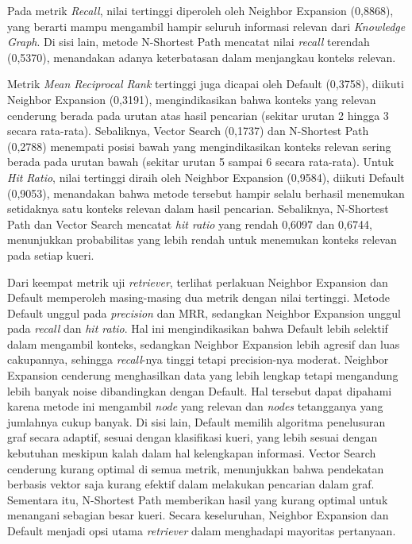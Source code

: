 Pada metrik \textit{Recall}, nilai tertinggi diperoleh oleh Neighbor Expansion (0,8868), yang berarti mampu mengambil hampir seluruh informasi relevan dari \textit{Knowledge Graph}.
Di sisi lain, metode N-Shortest Path mencatat nilai \textit{recall} terendah (0,5370), menandakan adanya keterbatasan dalam menjangkau konteks relevan.

Metrik \textit{Mean Reciprocal Rank} tertinggi juga dicapai oleh Default (0,3758), diikuti Neighbor Expansion (0,3191), mengindikasikan bahwa konteks yang relevan cenderung berada pada urutan atas hasil pencarian (sekitar urutan 2 hingga 3 secara rata-rata).
Sebaliknya, Vector Search (0,1737) dan N-Shortest Path (0,2788) menempati posisi bawah  yang mengindikasikan konteks relevan sering berada pada urutan bawah (sekitar urutan 5 sampai 6 secara rata-rata).
Untuk \textit{Hit Ratio}, nilai tertinggi diraih oleh Neighbor Expansion (0,9584), diikuti Default (0,9053), menandakan bahwa metode tersebut hampir selalu berhasil menemukan setidaknya satu konteks relevan dalam hasil pencarian.
Sebaliknya, N-Shortest Path dan Vector Search mencatat \textit{hit ratio} yang rendah 0,6097 dan 0,6744, menunjukkan probabilitas yang lebih rendah untuk menemukan konteks relevan pada setiap kueri.

Dari keempat metrik uji \textit{retriever}, terlihat perlakuan Neighbor Expansion dan Default memperoleh masing-masing dua metrik dengan nilai tertinggi.
Metode Default unggul pada \textit{precision} dan MRR, sedangkan Neighbor Expansion unggul pada \textit{recall} dan \textit{hit ratio}.
Hal ini mengindikasikan bahwa Default lebih selektif dalam mengambil konteks, sedangkan Neighbor Expansion lebih agresif dan luas cakupannya, sehingga \textit{recall}-nya tinggi tetapi precision-nya moderat.
Neighbor Expansion cenderung menghasilkan data yang lebih lengkap tetapi mengandung lebih banyak noise dibandingkan dengan Default.
Hal tersebut dapat dipahami karena metode ini mengambil \textit{node} yang relevan dan \textit{nodes} tetangganya yang jumlahnya cukup banyak.
Di sisi lain, Default memilih algoritma penelusuran graf secara adaptif, sesuai dengan klasifikasi kueri, yang lebih sesuai dengan kebutuhan meskipun kalah dalam hal kelengkapan informasi.
Vector Search cenderung kurang optimal di semua metrik, menunjukkan bahwa pendekatan berbasis vektor saja kurang efektif dalam melakukan pencarian dalam graf.
Sementara itu, N-Shortest Path memberikan hasil yang kurang optimal untuk menangani sebagian besar kueri.
Secara keseluruhan, Neighbor Expansion dan Default menjadi opsi utama \textit{retriever} dalam menghadapi mayoritas pertanyaan.



